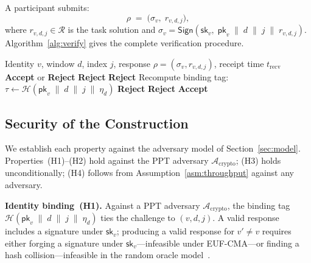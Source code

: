 \documentclass[11pt]{article}
\newcommand{\HCO}{HCO\xspace}
\theoremstyle{remark}
\theoremstyle{plain}
\begin{document}
	A participant submits:
	\[
	\rho \;=\; \bigl(\sigma_v,\; r_{v,d,j}\bigr),
	\]
	where $r_{v,d,j} \in \mathcal{R}$ is the task solution and
	$\sigma_v = \mathsf{Sign}(\mathsf{sk}_v,\;
	\mathsf{pk}_v \;\|\; d \;\|\; j \;\|\; r_{v,d,j})$.
	Algorithm~\ref{alg:verify} gives the complete verification procedure.
	
	\begin{algorithm}[t]
		\caption{$\HCO.\mathsf{Verify}(v,\, d,\, j,\, \rho,\, t_{\mathrm{recv}})$}
		\label{alg:verify}
		\begin{algorithmic}[1]
			\REQUIRE Identity $v$, window $d$, index $j$,
			response $\rho = (\sigma_v, r_{v,d,j})$,
			receipt time $t_{\mathrm{recv}}$
			\ENSURE \textbf{Accept} or \textbf{Reject}
			\RETURN \textbf{Reject} \hfill{}
			\ENDIF
			\RETURN \textbf{Reject} \hfill{}
			\ENDIF
			\STATE Recompute binding tag:
			$\tau \leftarrow \mathcal{H}(\mathsf{pk}_v \;\|\; d \;\|\; j \;\|\; \eta_d)$
			\RETURN \textbf{Reject} \hfill{}
			\ENDIF
			\RETURN \textbf{Reject} \hfill{}
			\ENDIF
			\RETURN \textbf{Accept}
		\end{algorithmic}
	\end{algorithm}
	
	\subsection{Security of the Construction}
	
	We establish each property against the adversary model of
	Section~\ref{sec:model}. Properties~(H1)--(H2) hold against the
	PPT adversary $\mathcal{A}_{\mathrm{crypto}}$; (H3) holds
	unconditionally; (H4) follows from
	Assumption~\ref{asm:throughput} against any adversary.
	
	\noindent\textbf{Identity binding~(H1).}
	Against a PPT adversary $\mathcal{A}_{\mathrm{crypto}}$, the
	binding tag $\mathcal{H}(\mathsf{pk}_v \;\|\; d \;\|\; j \;\|\;
	\eta_d)$ ties the challenge to $(v,d,j)$. A valid response
	includes a signature under $\mathsf{sk}_v$; producing a valid
	response for $v' \neq v$ requires either forging a signature under
	$\mathsf{sk}_v$---infeasible under EUF-CMA---or finding a hash
	collision---infeasible in the random oracle
	model~\cite{bellare1993random}.
	
\end{document}
